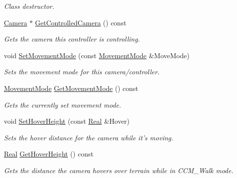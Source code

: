 \begin{DoxyCompactItemize}
\begin{DoxyCompactList}\small\item\em Class destructor. \item\end{DoxyCompactList}\item 
\hyperlink{classphys_1_1Camera}{Camera} $\ast$ \hyperlink{classphys_1_1CameraController_af992a4b3b720ac8179f78d5940a1bf1f}{GetControlledCamera} () const 
\begin{DoxyCompactList}\small\item\em Gets the camera this controller is controlling. \item\end{DoxyCompactList}\item 
void \hyperlink{classphys_1_1CameraController_aa8e4d48573a2443af3b2111ab82f8a17}{SetMovementMode} (const \hyperlink{classphys_1_1CameraController_af7ea701f4b768a0335e8e0115d516af8}{MovementMode} \&MoveMode)
\begin{DoxyCompactList}\small\item\em Sets the movement mode for this camera/controller. \item\end{DoxyCompactList}\item 
\hyperlink{classphys_1_1CameraController_af7ea701f4b768a0335e8e0115d516af8}{MovementMode} \hyperlink{classphys_1_1CameraController_a16f448ab4f9765f9435e0d3ac0fb89d3}{GetMovementMode} () const 
\begin{DoxyCompactList}\small\item\em Gets the currently set movement mode. \item\end{DoxyCompactList}\item 
void \hyperlink{classphys_1_1CameraController_a188b2fe215da11a2afc60e1b69b42c09}{SetHoverHeight} (const \hyperlink{namespacephys_af7eb897198d265b8e868f45240230d5f}{Real} \&Hover)
\begin{DoxyCompactList}\small\item\em Sets the hover distance for the camera while it's moving. \item\end{DoxyCompactList}\item 
\hyperlink{namespacephys_af7eb897198d265b8e868f45240230d5f}{Real} \hyperlink{classphys_1_1CameraController_af0bd947fa14276b01a27d68a4ca9a34d}{GetHoverHeight} () const 
\begin{DoxyCompactList}\small\item\em Gets the distance the camera hovers over terrain while in CCM\_\-Walk mode. \item\end{DoxyCompactList}\item 

\end{DoxyCompactItemize}
